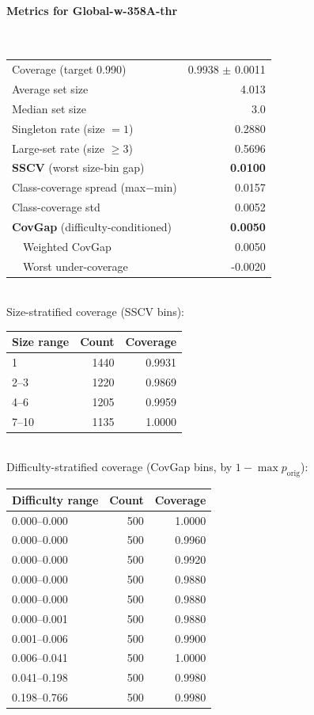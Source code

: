 \documentclass[parskip=half]{scrartcl}
\begin{document}
\paragraph{Metrics for Global-w-358A-thr}~\\
\begin{tabular}{l r}
\hline
Coverage (target 0.990) & 0.9938 $\pm$ 0.0011 \\
Average set size & 4.013 \\
Median set size & 3.0 \\
Singleton rate (size $=1$) & 0.2880 \\
Large-set rate (size $\geq 3$) & 0.5696 \\
\textbf{SSCV} (worst size-bin gap) & \textbf{0.0100} \\
Class-coverage spread (max$-$min) & 0.0157 \\
Class-coverage std & 0.0052 \\
\textbf{CovGap} (difficulty-conditioned) & \textbf{0.0050} \\
~~Weighted CovGap & 0.0050 \\
~~Worst under-coverage & -0.0020 \\
\hline
\end{tabular}\\[0.5em]
\textsf{\scriptsize Size-stratified coverage (SSCV bins):}\\
\begin{tabular}{l r r}
\hline
Size range & Count & Coverage \\
\hline
1 & 1440 & 0.9931 \\
2--3 & 1220 & 0.9869 \\
4--6 & 1205 & 0.9959 \\
7--10 & 1135 & 1.0000 \\
\hline
\end{tabular}\\[0.5em]
\textsf{\scriptsize Difficulty-stratified coverage (CovGap bins, by $1-\max p_{\mathrm{orig}}$):}\\
\begin{tabular}{l r r}
\hline
Difficulty range & Count & Coverage \\
\hline
0.000--0.000 & 500 & 1.0000 \\
0.000--0.000 & 500 & 0.9960 \\
0.000--0.000 & 500 & 0.9920 \\
0.000--0.000 & 500 & 0.9880 \\
0.000--0.000 & 500 & 0.9880 \\
0.000--0.001 & 500 & 0.9880 \\
0.001--0.006 & 500 & 0.9900 \\
0.006--0.041 & 500 & 1.0000 \\
0.041--0.198 & 500 & 0.9980 \\
0.198--0.766 & 500 & 0.9980 \\
\hline
\end{tabular}\\[0.5em]
\end{document}
